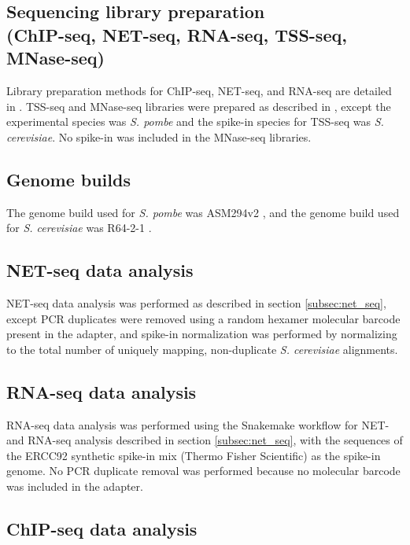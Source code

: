 \subsection{Sequencing library preparation\\(ChIP-seq, NET-seq, RNA-seq, TSS-seq, MNase-seq)}

Library preparation methods for ChIP-seq, NET-seq, and RNA-seq are detailed in \citet{shetty2017}.
TSS-seq and MNase-seq libraries were prepared as described in \citet{doris2018}, except the experimental species was \textit{S. pombe} and the spike-in species for TSS-seq was \textit{S. cerevisiae}.
No spike-in was included in the MNase-seq libraries.

\subsection{Genome builds}

The genome build used for \textit{S. pombe} was ASM294v2 \citep{wood2002}, and the genome build used for \textit{S. cerevisiae} was R64-2-1 \citep{engel2014}.

\subsection{NET-seq data analysis}

NET-seq data analysis was performed as described in section \ref{subsec:net_seq}, except PCR duplicates were removed using a random hexamer molecular barcode present in the adapter, and spike-in normalization was performed by normalizing to the total number of uniquely mapping, non-duplicate \textit{S. cerevisiae} alignments.

\subsection{RNA-seq data analysis}

RNA-seq data analysis was performed using the Snakemake workflow for NET- and RNA-seq analysis described in section \ref{subsec:net_seq}, with the sequences of the ERCC92 synthetic spike-in mix (Thermo Fisher Scientific) as the spike-in genome.
No PCR duplicate removal was performed because no molecular barcode was included in the adapter.

\subsection{ChIP-seq data analysis}

